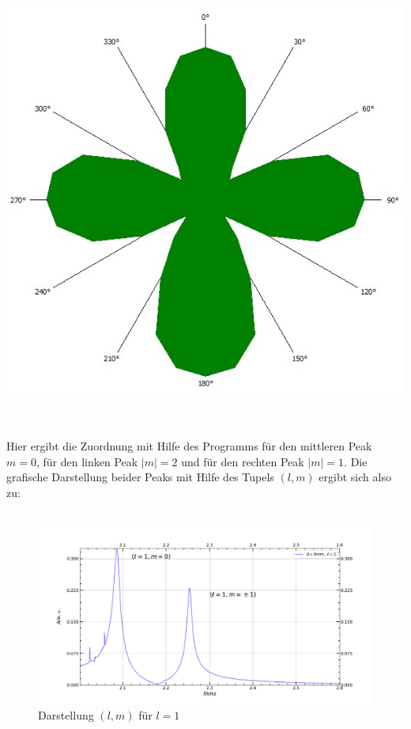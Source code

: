 \documentclass[german,  %
parskip=full,  %
]{scrartcl}
\begin{document}
\\\\
\begin{minipage}{0.48 \textwidth} \centering
\includegraphics[scale=0.3]{445_l2_rechter_Peak.jpg}
\end{minipage}
\\\\
Hier ergibt die Zuordnung mit Hilfe des Programms für den mittleren Peak $m=0$, für den linken Peak $|m|=2$ und für den rechten Peak $|m|=1$.
\newline Die grafische Darstellung beider Peaks mit Hilfe des Tupels $(l,m)$ ergibt sich also zu:
\\\\
\begin{figure}[h!]
\centering
\includegraphics[width=\textwidth]{445_fuer_l_gleich_1.png}
\caption{Darstellung $(l,m)$ für $l=1$}
\end{figure}
\end{document}
